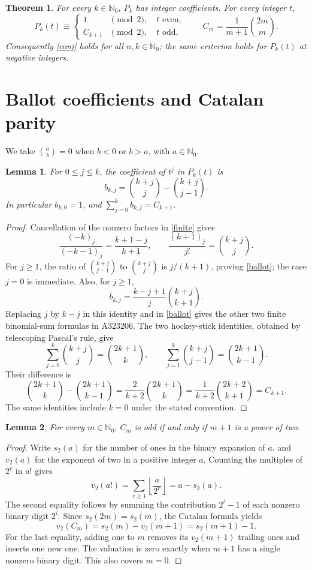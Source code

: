 \documentclass[11pt]{article}
\newtheorem{theorem}{Theorem}
\newtheorem{lemma}{Lemma}
\newcommand{\NN}{\mathbb N_0}
\begin{document}
\begin{theorem}\label{main}
For every $k\in\NN$, $P_k$ has integer coefficients. For every integer $t$,
\[
 P_k(t)\equiv
 \begin{cases}
 1 &\pmod2,\quad t\text{ even},\\
 C_{k+1}&\pmod2,\quad t\text{ odd},
 \end{cases}
 \qquad C_m=\frac1{m+1}\binom{2m}{m}.
\]
Consequently \eqref{conj} holds for all $n,k\in\NN$; the same criterion
holds for $P_k(t)$ at negative integers.
\end{theorem}

\section{Ballot coefficients and Catalan parity}
We take $\binom ab=0$ when $b<0$ or $b>a$, with $a\in\NN$.

\begin{lemma}\label{coeff}
For $0\le j\le k$, the coefficient of $t^j$ in $P_k(t)$ is
\begin{equation}
 b_{k,j}=\binom{k+j}{j}-\binom{k+j}{j-1}.
 \label{ballot}
\end{equation}
In particular $b_{k,0}=1$, and $\sum_{j=0}^k b_{k,j}=C_{k+1}$.
\end{lemma}
\begin{proof}
Cancellation of the nonzero factors in \eqref{finite} gives
\[
 \frac{(-k)_j}{(-k-1)_j}=\frac{k+1-j}{k+1},\qquad
 \frac{(k+1)_j}{j!}=\binom{k+j}{j}.
\]
For $j\ge1$, the ratio of $\binom{k+j}{j-1}$ to
$\binom{k+j}{j}$ is $j/(k+1)$, proving \eqref{ballot}; the case $j=0$
is immediate. Also, for $j\ge1$,
\[
 b_{k,j}=\frac{k-j+1}{j}\binom{k+j}{k+1}.
\]
Replacing $j$ by $k-j$ in this identity and in \eqref{ballot} gives
the other two finite binomial-sum formulas in A323206.
The two hockey-stick identities, obtained by telescoping
Pascal's rule, give
\[
 \sum_{j=0}^k\binom{k+j}{j}=\binom{2k+1}{k},\qquad
 \sum_{j=1}^k\binom{k+j}{j-1}=\binom{2k+1}{k-1}.
\]
Their difference is
\[
 \binom{2k+1}{k}-\binom{2k+1}{k-1}
 =\frac{2}{k+2}\binom{2k+1}{k}
 =\frac{1}{k+2}\binom{2k+2}{k+1}=C_{k+1}.
\]
The same identities include $k=0$ under the stated convention.
\end{proof}

\begin{lemma}\label{catparity}
For every $m\in\NN$, $C_m$ is odd if and only if $m+1$ is a power of two.
\end{lemma}
\begin{proof}
Write $s_2(a)$ for the number of ones in the binary expansion of $a$,
and $v_2(a)$ for the exponent of two in a positive integer $a$.
Counting the multiples of $2^r$ in $a!$ gives
\[
 v_2(a!)=\sum_{r\ge1}\left\lfloor\frac{a}{2^r}\right\rfloor
 =a-s_2(a).
\]
The second equality follows by summing the contribution $2^i-1$ of
each nonzero binary digit $2^i$. Since $s_2(2m)=s_2(m)$, the Catalan
formula yields
\[
 v_2(C_m)=s_2(m)-v_2(m+1)=s_2(m+1)-1.
\]
For the last equality, adding one to $m$ removes its $v_2(m+1)$ trailing
ones and inserts one new one. The valuation is zero exactly when $m+1$
has a single nonzero binary digit. This also covers $m=0$.
\end{proof}
\end{document}
